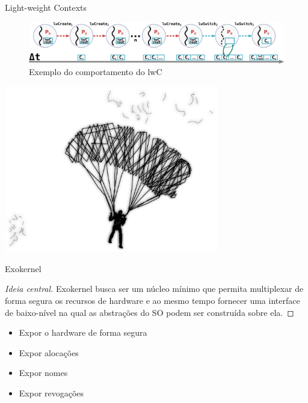 \documentclass[xcolor={usenames,svgnames,dvipsnames},brazil,english,12pt,aspectratio=149]{beamer}
\begin{document}
\begin{frame}{Light-weight Contexts}
  \begin{figure}[!h]
    \centering
    \includegraphics[width=\textwidth]{lwC} 
    \caption*{Exemplo do comportamento do lwC}
  \end{figure}
\end{frame}

\begin{frame}[plain]
  \includegraphics[width=0.7\textwidth]{presentation_cap2_nine}
\end{frame}

\begin{frame}{Exokernel}
  \begin{proof}[Ideia central]
Exokernel busca ser um núcleo mínimo que permita multiplexar de forma segura os
recursos de hardware e ao mesmo tempo fornecer uma interface de baixo-nível na
qual as abstrações do SO podem ser construída sobre ela.
  \end{proof}

  \begin{itemize}
    \item Expor o hardware de forma segura
    \item Expor alocações
    \item Expor nomes
    \item Expor revogações
  \end{itemize}

\end{frame}

\end{document}
